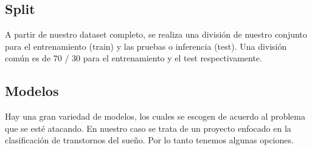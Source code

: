 \documentclass{replab}
\begin{document}
\subsection{Split}

A partir de nuestro dataset completo, se realiza una división de nuestro conjunto para el entrenamiento (train) y las pruebas o inferencia (test). Una división común es de 70 / 30 para el entrenamiento y el test respectivamente.

    \subsection{Modelos}

Hay una gran variedad de modelos, los cuales se escogen de acuerdo al problema que se esté atacando. En nuestro caso se trata de un proyecto enfocado en la clasificación de transtornos del sueño. Por lo tanto tenemos algunas opciones.
\end{document}
